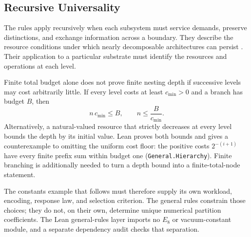 \subsection{Recursive Universality}
\label{sec:recursive_universality}

The rules apply recursively when each subsystem must service demands, preserve distinctions, and exchange information across a boundary. They describe the resource conditions under which nearly decomposable architectures can persist \cite{klir_architecture_1991}. Their application to a particular substrate must identify the resources and operations at each level.

Finite total budget alone does not prove finite nesting depth if successive levels may cost arbitrarily little. If every level costs at least $c_{\min}>0$ and a branch has budget $B$, then
\begin{equation}
    n\,c_{\min}\leq B,
    \qquad n\leq\frac{B}{c_{\min}}.
\end{equation}
Alternatively, a natural-valued resource that strictly decreases at every level bounds the depth by its initial value. Lean proves both bounds and gives a counterexample to omitting the uniform cost floor: the positive costs $2^{-(i+1)}$ have every finite prefix sum within budget one (\texttt{General.Hierarchy}). Finite branching is additionally needed to turn a depth bound into a finite-total-node statement.

The constants example that follows must therefore supply its own workload, encoding, response law, and selection criterion. The general rules constrain those choices; they do not, on their own, determine unique numerical partition coefficients. The Lean general-rules layer imports no $E_8$ or vacuum-constant module, and a separate dependency audit checks that separation.
